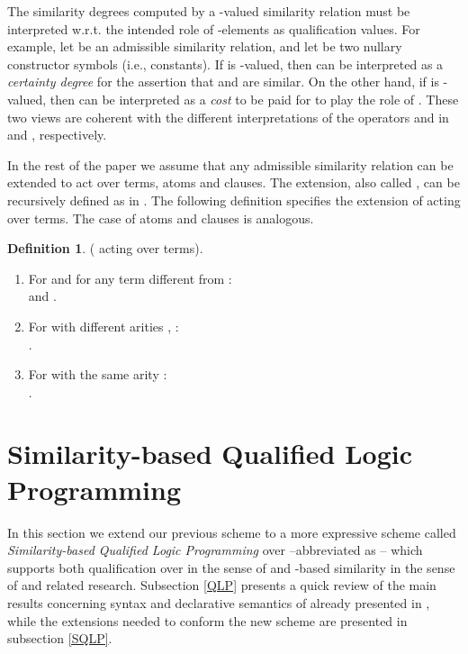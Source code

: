 \documentclass{sigplanconf}
\theoremstyle{definition}
\newtheorem{definition}{Definition}
\theoremstyle{plain}
\begin{document}
The similarity degrees computed by a -valued similarity relation must be interpreted w.r.t. the intended role of -elements as qualification values. For example, let   be an admissible similarity relation, and let  be two nullary constructor symbols (i.e., constants). If  is -valued, then  can be interpreted as a {\em certainty degree} for the assertion that  and  are similar. On the other hand, if  is -valued, then  can be interpreted as a {\em cost} to be paid for  to play the role of . These two views are coherent with the different interpretations of the operators  and  in  and , respectively.

In the rest of the paper we assume that any admissible similarity relation  can be extended to act over terms, atoms and clauses. The extension, also called , can be recursively defined as in \cite{Ses02}. The following definition specifies the extension of  acting over terms. The case of atoms and clauses is analogous.

\begin{definition} ( acting over terms). \label{def:ER}
\begin{enumerate}
    \item For  and for any term  different from :\\
     and .

    \item For  with different arities , :\\
    .

    \item For  with the same arity :\\
    .
\end{enumerate}
\end{definition}

\section{Similarity-based Qualified Logic Programming}\label{Language}

In this section  we extend our previous scheme    to a more expressive scheme called \emph{Similarity-based Qualified Logic Programming} over  --abbreviated as -- which supports both qualification over  in the sense of \cite{RR08} and -based similarity in the sense of \cite{Ses02} and related research. Subsection \ref{QLP} presents a quick review of the main results concerning syntax and declarative semantics of  already presented in \cite{RR08}, while the extensions needed to conform the new  scheme are presented in subsection \ref{SQLP}.
\end{document}
